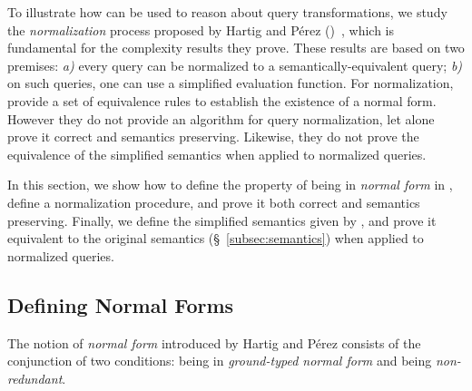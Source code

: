 To illustrate how \gcoql can be used to reason about query transformations, we study the {\em normalization} process proposed by Hartig and Pérez (\HP)~\cite{gqlph}, which is fundamental for the complexity results they prove.
%
These results are based on two premises: {\em a)} every query can be normalized to a semantically-equivalent query; {\em b)} on such queries, one can use a simplified evaluation function. For normalization,  \HP provide a set of equivalence rules to establish the existence of a normal form. However they do not provide an algorithm for query normalization, let alone prove it correct and semantics preserving. Likewise, they do not prove the equivalence of the simplified semantics when applied to normalized queries.

In this section, we show how to define the property of being in \textit{normal form} in \gcoql, define a normalization procedure, and prove it both correct and semantics preserving. Finally, we define the simplified semantics given by \HP, and prove it equivalent to the original semantics (\S~\ref{subsec:semantics}) when applied to normalized queries.


\subsection{Defining Normal Forms}

The notion of \textit{normal form} introduced by Hartig and Pérez consists of the conjunction of two conditions: being in \textit{ground-typed normal form} and being \textit{non-redundant}.


